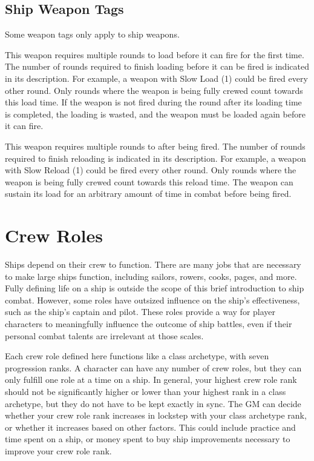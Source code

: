     \subsection{Ship Weapon Tags}
        Some weapon tags only apply to ship weapons.

         This weapon requires multiple rounds to load before it can fire for the first time.
        The number of rounds required to finish loading before it can be fired is indicated in its description.
        For example, a weapon with Slow Load (1) could be fired every other round.
        Only rounds where the weapon is being fully crewed count towards this load time.
        If the weapon is not fired during the round after its loading time is completed, the loading is wasted, and the weapon must be loaded again before it can fire.

         This weapon requires multiple rounds to after being fired.
        The number of rounds required to finish reloading is indicated in its description.
        For example, a weapon with Slow Reload (1) could be fired every other round.
        Only rounds where the weapon is being fully crewed count towards this reload time.
        The weapon can sustain its load for an arbitrary amount of time in combat before being fired.

\section{Crew Roles}
    Ships depend on their crew to function.
    There are many jobs that are necessary to make large ships function, including sailors, rowers, cooks, pages, and more.
    Fully defining life on a ship is outside the scope of this brief introduction to ship combat.
    However, some roles have outsized influence on the ship's effectiveness, such as the ship's captain and pilot.
    These roles provide a way for player characters to meaningfully influence the outcome of ship battles, even if their personal combat talents are irrelevant at those scales.

    Each crew role defined here functions like a class archetype, with seven progression ranks.
    A character can have any number of crew roles, but they can only fulfill one role at a time on a ship.
    In general, your highest crew role rank should not be significantly higher or lower than your highest rank in a class archetype, but they do not have to be kept exactly in sync.
    The GM can decide whether your crew role rank increases in lockstep with your class archetype rank, or whether it increases based on other factors.
    This could include practice and time spent on a ship, or money spent to buy ship improvements necessary to improve your crew role rank.

